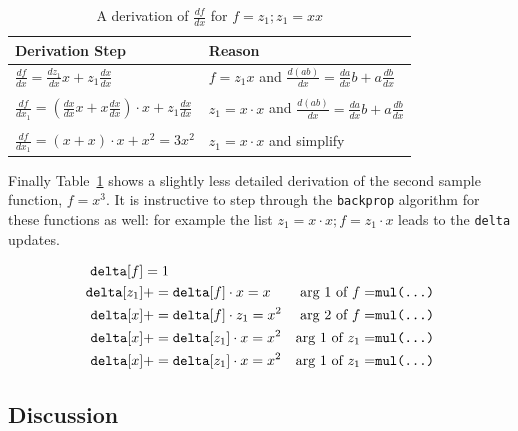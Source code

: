 \documentclass[12pt]{article}
\newcommand{\cd}[1]{\texttt{#1}}
\newcommand{\deriv}[2]{\frac{d{}#1}{d{}#2}}
\begin{document}
\begin{table}
\begin{tabular}{l|l}
Derivation Step & Reason \\
\hline
\( \deriv{f}{x}  =  \deriv{z_1}{x} x  +  z_1 \deriv{x}{x} \)
         & $f=z_1 x$ and $\deriv{(ab)}{x} = \deriv{a}{x}b + a\deriv{b}{x}$ \\
& \\
\( \deriv{f}{x_1}  =  \left( \deriv{x}{x} x + x \deriv{x}{x} \right)  \cdot x +  z_1 \deriv{x}{x} \)
         & $z_1 = x\cdot x$ and $\deriv{(ab)}{x} = \deriv{a}{x}b + a\deriv{b}{x}$ \\
& \\
\( \deriv{f}{x_1}  =  \left( x + x \right)  \cdot x +  x^2  = 3 x^2 \)
         & $z_1 = x\cdot x$ and simplify \\
\hline
\end{tabular}
\caption{A derivation of $\deriv{f}{x}$ for $f = z_1; z_1 = x x$ }
\label{dx:xcubed}
\end{table}

Finally Table~\ref{dx:xcubed} shows a slightly less detailed
derivation of the second sample function, $f = x^3$.  It is
instructive to step through the \cd{backprop} algorithm for these
functions as well: for example the list $z_1 = x\cdot x; f = z_1 \cdot x$ 
leads to the \cd{delta} updates. 


\begin{eqnarray*}
\cd{delta}[f]   & =  1  \\
\cd{delta}[z_1] & +=  \cd{delta}[f] \cdot x = x & \mbox{arg 1 of $f=$\cd{mul(...)}}\\
\cd{delta}[x]   & +=  \cd{delta}[f] \cdot z_1 = x^2 & \mbox{arg 2 of $f=$\cd{mul(...)}}\\
\cd{delta}[x]   & +=  \cd{delta}[z_1] \cdot x = x^2 & \mbox{arg 1 of $z_1=$\cd{mul(...)}}\\
\cd{delta}[x]   & +=  \cd{delta}[z_1] \cdot x = x^2 & \mbox{arg 1 of $z_1=$\cd{mul(...)}}
\end{eqnarray*}

\subsection{Discussion}
\end{document}
